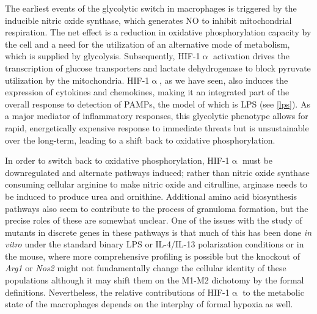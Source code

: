 The earliest events of the glycolytic switch in macrophages is triggered by the inducible nitric oxide synthase, which generates NO to inhibit mitochondrial respiration. The net effect is a reduction in oxidative phosphorylation capacity by the cell and a need for the utilization of an alternative mode of metabolism, which is supplied by glycolysis. Subsequently, HIF-1$\upalpha$ activation drives the transcription of glucose transporters and lactate dehydrogenase to block pyruvate utilization by the mitochondria. HIF-1$\upalpha$, as we have seen, also induces the expression of cytokines and chemokines, making it an integrated part of the overall response to detection of PAMPs, the model of which is LPS (see \autoref{lps}). As a major mediator of inflammatory responses, this glycolytic phenotype allows for rapid, energetically expensive response to immediate threats but is unsustainable over the long-term, leading to a shift back to oxidative phosphorylation.

\citep{ElKasmi2008}

In order to switch back to oxidative phosphorylation, HIF-1$\upalpha$ must be downregulated and alternate pathways induced; rather than nitric oxide synthase consuming cellular arginine to make nitric oxide and citrulline, arginase needs to be induced to produce urea and ornithine. Additional amino acid biosynthesis pathways also seem to contribute to the process of granuloma formation, but the precise roles of these are somewhat unclear. One of the issues with the study of mutants in discrete genes in these pathways is that much of this has been done \textit{in vitro} under the standard binary LPS or IL-4/IL-13 polarization conditions or in the mouse, where more comprehensive profiling is possible but the knockout of \textit{Arg1} or \textit{Nos2} might not fundamentally change the cellular identity of these populations although it may shift them on the M1-M2 dichotomy by the formal definitions. Nevertheless, the relative contributions of HIF-1$\upalpha$ to the metabolic state of the macrophages depends on the interplay of formal hypoxia as well. 

